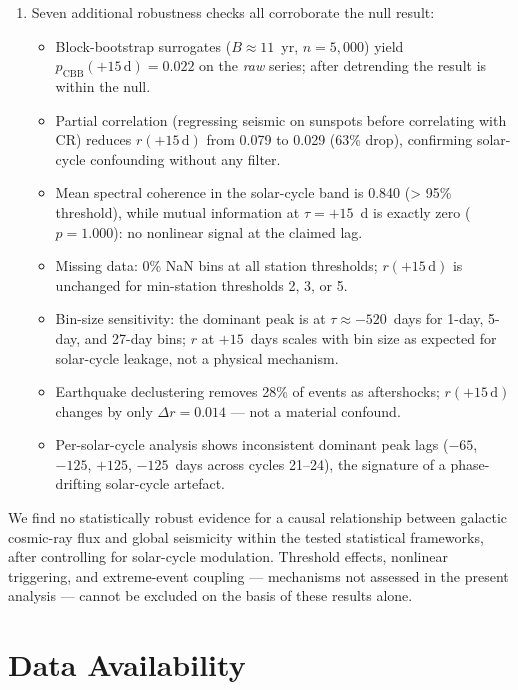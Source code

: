 \documentclass[12pt,a4paper]{article}
\begin{document}
\begin{enumerate}
  \item Seven additional robustness checks all corroborate the null result:
    \begin{itemize}
      \item Block-bootstrap surrogates ($B \approx 11$~yr, $n = 5{,}000$) yield
        $p_\text{CBB}(+15\,\text{d}) = 0.022$ on the \emph{raw} series;
        after detrending the result is within the null.
      \item Partial correlation (regressing seismic on sunspots before correlating
        with CR) reduces $r(+15\,\text{d})$ from 0.079 to 0.029 (63\% drop),
        confirming solar-cycle confounding without any filter.
      \item Mean spectral coherence in the solar-cycle band is 0.840 (> 95\%
        threshold), while mutual information at $\tau = +15$~d is exactly zero
        ($p = 1.000$): no nonlinear signal at the claimed lag.
      \item Missing data: 0\% NaN bins at all station thresholds;
        $r(+15\,\text{d})$ is unchanged for min-station thresholds 2, 3, or 5.
      \item Bin-size sensitivity: the dominant peak is at $\tau \approx -520$~days
        for 1-day, 5-day, and 27-day bins; $r$ at $+15$~days scales with bin size
        as expected for solar-cycle leakage, not a physical mechanism.
      \item Earthquake declustering removes 28\% of events as aftershocks;
        $r(+15\,\text{d})$ changes by only $\Delta r = 0.014$ --- not a material confound.
      \item Per-solar-cycle analysis shows inconsistent dominant peak lags
        ($-65$, $-125$, $+125$, $-125$~days across cycles 21--24),
        the signature of a phase-drifting solar-cycle artefact.
    \end{itemize}
\end{enumerate}

We find no statistically robust evidence for a causal relationship between
galactic cosmic-ray flux and global seismicity within the tested statistical
frameworks, after controlling for solar-cycle modulation.
Threshold effects, nonlinear triggering, and extreme-event coupling ---
mechanisms not assessed in the present analysis --- cannot be excluded on
the basis of these results alone.

\section*{Data Availability}
\end{document}
